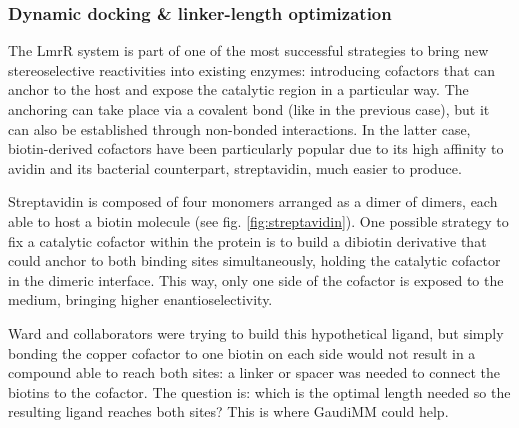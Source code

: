 \subsubsection{Dynamic docking \& linker-length optimization}
\label{section:dibiotin-linker-length-optimization}

The LmrR system is part of one of the most successful strategies to bring new stereoselective reactivities into existing enzymes: introducing cofactors that can anchor to the host and expose the catalytic region in a particular way. The anchoring can take place via a covalent bond (like in the previous case), but it can also be established through non-bonded interactions. In the latter case, biotin-derived cofactors have been particularly popular due to its high affinity to avidin and its bacterial counterpart, streptavidin, much easier to produce.

Streptavidin is composed of four monomers arranged as a dimer of dimers, each able to host a biotin molecule (see fig. \ref{fig:streptavidin}). One possible strategy to fix a catalytic cofactor within the protein is to build a dibiotin derivative that could anchor to both binding sites simultaneously, holding the catalytic cofactor in the dimeric interface. This way, only one side of the cofactor is exposed to the medium, bringing higher enantioselectivity.

Ward and collaborators were trying to build this hypothetical ligand, but simply bonding the copper cofactor to one biotin on each side would not result in a compound able to reach both sites: a linker or spacer was needed to connect the biotins to the cofactor. The question is: which is the optimal length needed so the resulting ligand reaches both sites? This is where GaudiMM could help.

